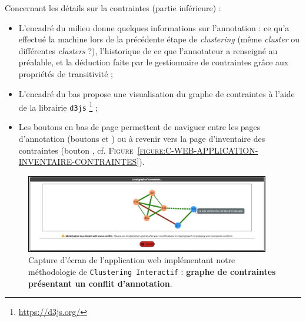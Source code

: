 			Concernant les détails sur la contraintes (partie inférieure) :
			\begin{itemize}
				\item L'encadré du milieu donne quelques informations sur l'annotation : ce qu'a effectué la machine lors de la précédente étape de \textit{clustering} (même \textit{cluster} ou différentes \textit{clusters} ?), l'historique de ce que l'annotateur a renseigné au préalable, et la déduction faite par le gestionnaire de contraintes grâce aux propriétés de transitivité ;
				\item L'encadré du bas propose une visualisation du graphe de contraintes à l'aide de la librairie \texttt{d3js} \footnote {
					\url{https://d3js.org/}
				} ;
				\item Les boutons en bas de page permettent de naviguer entre les pages d'annotation (boutons \textguillemets{\faAngleLeft} et \textguillemets{\faAngleRight}) ou à revenir vers la page d'inventaire des contraintes (bouton \textguillemets{\faList}, cf. \textsc{Figure~\ref{figure:C-WEB-APPLICATION-INVENTAIRE-CONTRAINTES}}).
			\end{itemize}
			
			\begin{figure}[H]
				\centering
				\includegraphics[width=0.95\textwidth]{figures/interactive-clustering-application-annotation-4conflit}
				\caption{
					Capture d'écran de l'application web implémentant notre méthodologie de \texttt{Clustering Interactif} : \textbf{graphe de contraintes présentant un conflit d'annotation}.
				}
				\label{figure:C-WEB-APPLICATION-CONFLIT}
			\end{figure}
			
